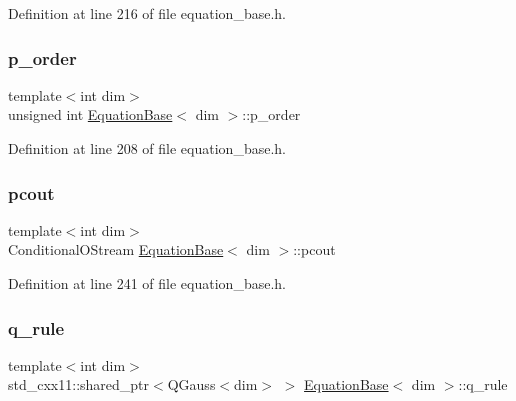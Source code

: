 Definition at line 216 of file equation\+\_\+base.\+h.

\mbox{\label{class_equation_base_a0facd1cc5977e32b301a134ed5b9fa98}} 
\subsubsection{\texorpdfstring{p\+\_\+order}{p\_order}}
{\footnotesize\ttfamily template$<$int dim$>$ \\
unsigned int \hyperlink{class_equation_base}{Equation\+Base}$<$ dim $>$\+::p\+\_\+order\hspace{0.3cm}{\ttfamily [protected]}}



Definition at line 208 of file equation\+\_\+base.\+h.

\mbox{\label{class_equation_base_a12dd28de05c41d4dd3ec30e7195bfa97}} 
\subsubsection{\texorpdfstring{pcout}{pcout}}
{\footnotesize\ttfamily template$<$int dim$>$ \\
Conditional\+O\+Stream \hyperlink{class_equation_base}{Equation\+Base}$<$ dim $>$\+::pcout\hspace{0.3cm}{\ttfamily [protected]}}



Definition at line 241 of file equation\+\_\+base.\+h.

\mbox{\label{class_equation_base_a5e677b436f1abeeeffc3da284e5c1c4c}} 
\subsubsection{\texorpdfstring{q\+\_\+rule}{q\_rule}}
{\footnotesize\ttfamily template$<$int dim$>$ \\
std\+\_\+cxx11\+::shared\+\_\+ptr$<$Q\+Gauss$<$dim$>$ $>$ \hyperlink{class_equation_base}{Equation\+Base}$<$ dim $>$\+::q\+\_\+rule\hspace{0.3cm}{\ttfamily [protected]}}



